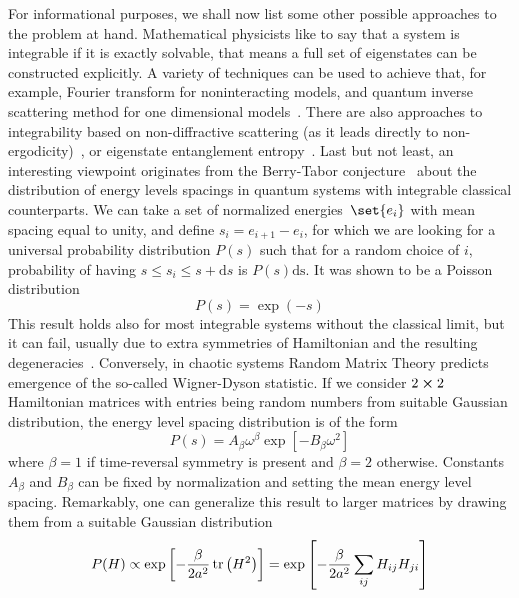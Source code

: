For informational purposes, we shall now list some other possible approaches to the problem at
hand. Mathematical physicists like to say that a system is integrable if it is exactly
solvable, that means a full set of eigenstates can be constructed explicitly. A variety
of techniques can be used to achieve that, for example, Fourier transform for
noninteracting models, and quantum inverse scattering method for one dimensional 
models~\autocite{Faddeev1996,Korepin1993,Ilievski2014}. There are also approaches
to integrability based on non-diffractive scattering (as it leads directly 
to non-ergodicity)~\autocite{Sutherland2004}, or eigenstate entanglement entropy~\autocite{ydzba2020}.
Last but not least, an interesting viewpoint originates from the Berry-Tabor conjecture~\autocite{Berry1977} about the
distribution of energy levels spacings in quantum systems with integrable classical counterparts.
We can take a set of normalized energies~\(\set{e_i}\) with mean spacing equal to unity,
and define \(s_i = e_{i+1}-e_i\), for which we are looking for a universal probability
distribution \(P(s)\) such that for a random choice of \(i\), probability of having
\(s \leq s_i \leq s+\mathrm{d}s\) is \(P(s)\mathrm{ds}\). It was shown to be a Poisson
distribution~\autocite{Ott2002}
\begin{equation}
    P(s) = \exp(-s)
\end{equation}
This result holds also for most integrable systems without the classical limit, but it can fail,
usually due to extra symmetries of Hamiltonian and the resulting degeneracies~\autocite{DAlessio2016}.
Conversely, in chaotic systems Random Matrix Theory predicts emergence of the so-called Wigner-Dyson
statistic. If we consider \(2\cross 2\) Hamiltonian matrices with entries being random numbers from suitable
Gaussian distribution, the energy level spacing distribution is of the form~\autocite{DAlessio2016}
\begin{equation}
    P(s) = A_{\beta} \omega^{\beta} \exp\left[-B_{\beta} \omega^2\right]
\end{equation}
where \(\beta = 1\) if time-reversal symmetry is present and \(\beta = 2\) otherwise.
Constants \(A_{\beta}\) and \(B_{\beta}\) can be fixed by normalization and setting the mean energy level
spacing. Remarkably, one can generalize this result to larger matrices by drawing
them from a suitable Gaussian distribution~\autocite{Alhassid2000}
\begin{equation}
    P(H) \propto \exp\left[-\frac{\beta}{2a^2}\tr\left(H^2\right)\right] =
    \exp\left[-\frac{\beta}{2a^2}\sum_{ij} H_{ij}H_{ji}\right]
    \label{eq:GOE}
\end{equation}
